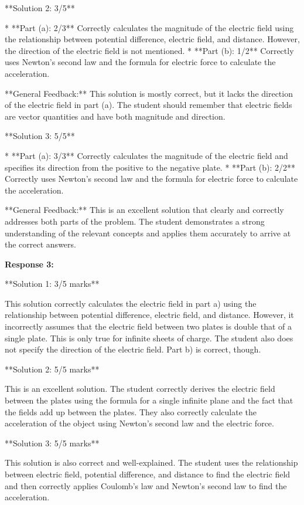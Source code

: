 \documentclass[a4paper,11pt]{article}
\begin{document}
**Solution 2: 3/5**

*   **Part (a): 2/3** Correctly calculates the magnitude of the electric field using the relationship between potential difference, electric field, and distance. However, the direction of the electric field is not mentioned.
*   **Part (b): 1/2** Correctly uses Newton's second law and the formula for electric force to calculate the acceleration.

**General Feedback:** This solution is mostly correct, but it lacks the direction of the electric field in part (a). The student should remember that electric fields are vector quantities and have both magnitude and direction.

**Solution 3: 5/5**

*   **Part (a): 3/3** Correctly calculates the magnitude of the electric field and specifies its direction from the positive to the negative plate.
*   **Part (b): 2/2** Correctly uses Newton's second law and the formula for electric force to calculate the acceleration.

**General Feedback:** This is an excellent solution that clearly and correctly addresses both parts of the problem. The student demonstrates a strong understanding of the relevant concepts and applies them accurately to arrive at the correct answers.


\textbf{Response 3:}

**Solution 1: 3/5 marks**

This solution correctly calculates the electric field in part a) using the relationship between potential difference, electric field, and distance. However, it incorrectly assumes that the electric field between two plates is double that of a single plate. This is only true for infinite sheets of charge. The student also does not specify the direction of the electric field. Part b) is correct, though.

**Solution 2: 5/5 marks**

This is an excellent solution. The student correctly derives the electric field between the plates using the formula for a single infinite plane and the fact that the fields add up between the plates. They also correctly calculate the acceleration of the object using Newton's second law and the electric force.

**Solution 3: 5/5 marks**

This solution is also correct and well-explained. The student uses the relationship between electric field, potential difference, and distance to find the electric field and then correctly applies Coulomb's law and Newton's second law to find the acceleration.
\end{document}

